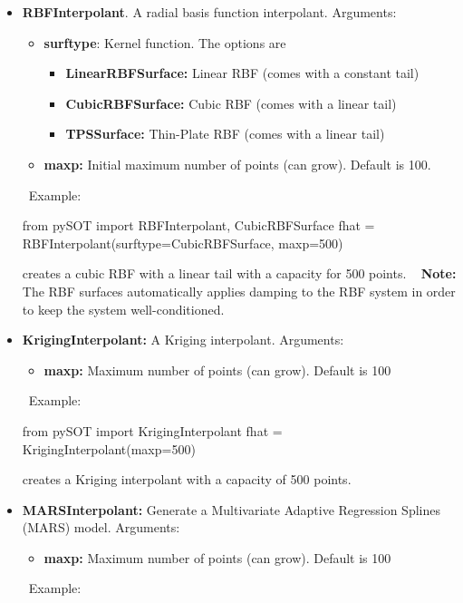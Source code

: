 \documentclass[]{article}
\begin{document}
\begin{itemize}
\item \textbf{RBFInterpolant}. A radial basis function interpolant. Arguments:
\begin{itemize}
\item \textbf{surftype}: Kernel function. The options are 
\begin{itemize}
\item \textbf{LinearRBFSurface:} Linear RBF (comes with a constant tail)
\item \textbf{CubicRBFSurface:} Cubic RBF (comes with a linear tail)
\item \textbf{TPSSurface:} Thin-Plate RBF (comes with a linear tail)
\end{itemize}
\item \textbf{maxp:} Initial maximum number of points (can grow). Default is 100.
\end{itemize}
\ \newline Example:
\begin{python}
from pySOT import RBFInterpolant, CubicRBFSurface
fhat = RBFInterpolant(surftype=CubicRBFSurface, maxp=500)
\end{python}
creates a cubic RBF with a linear tail with a capacity for 500 points.  \newline \ \newline
\textbf{Note:} The RBF surfaces automatically applies damping to the RBF system in order to keep the system well-conditioned. 
\item \textbf{KrigingInterpolant:} A Kriging interpolant. Arguments:
\begin{itemize}
\item \textbf{maxp:} Maximum number of points (can grow). Default is 100
\end{itemize}
\ \newline Example:
\begin{python}
from pySOT import KrigingInterpolant
fhat = KrigingInterpolant(maxp=500)
\end{python}
creates a Kriging interpolant with a capacity of 500 points.
\item \textbf{MARSInterpolant:} Generate a Multivariate Adaptive Regression Splines (MARS) model. Arguments:
\begin{itemize}
\item \textbf{maxp:} Maximum number of points (can grow). Default is 100
\end{itemize}
\ \newline Example: 
\begin{python}

\end{python}
\end{itemize}
\end{document}
